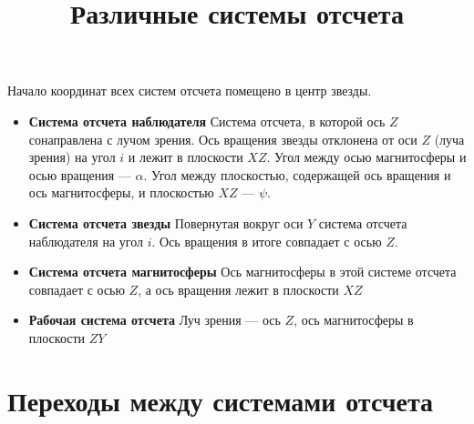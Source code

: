\documentclass[12pt]{article}
\begin{document}
\title{Различные системы отсчета}
\maketitle

Начало координат всех систем отсчета помещено в центр звезды.

\begin{itemize}
\item \textbf{Система отсчета наблюдателя}
Система отсчета, в которой ось $Z$ сонаправлена с лучом зрения. Ось вращения звезды отклонена от оси $Z$ (луча зрения) на угол $i$ и лежит в плоскости $XZ$. Угол между осью магнитосферы и осью вращения --- $\alpha$. Угол между плоскостью, содержащей ось вращения и ось магнитосферы, и плоскостью $XZ$ --- $\psi$. 
\item \textbf{Система отсчета звезды}
Повернутая вокруг оси $Y$ система отсчета наблюдателя на угол $i$. Ось вращения в итоге совпадает с осью $Z$. 
\item \textbf{Система отсчета магнитосферы}
Ось магнитосферы в этой системе отсчета совпадает с осью $Z$, а ось вращения лежит в плоскости $XZ$ 
\item \textbf{Рабочая система отсчета}
Луч зрения --- ось $Z$, ось магнитосферы в плоскости $ZY$
\end{itemize}

\section{Переходы между системами отсчета}
\end{document}
